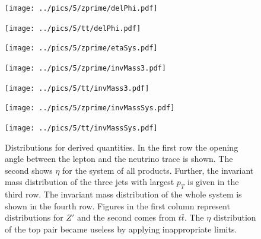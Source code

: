 \begin{figure}[H]
\begin{center}
\begin{minipage}{\minwidth\textwidth}
 \texttt{[image: ../pics/5/zprime/delPhi.pdf]}
\end{minipage}
\begin{minipage}{\minwidth\textwidth}
 \texttt{[image: ../pics/5/tt/delPhi.pdf]}
\end{minipage}

\begin{minipage}{\minwidth\textwidth}
 \texttt{[image: ../pics/5/zprime/etaSys.pdf]}
\end{minipage}
\begin{minipage}{\minwidth\textwidth}
\end{minipage}


\begin{minipage}{\minwidth\textwidth}
 \texttt{[image: ../pics/5/zprime/invMass3.pdf]}
\end{minipage}
\begin{minipage}{\minwidth\textwidth}
 \texttt{[image: ../pics/5/tt/invMass3.pdf]}
\end{minipage}

\begin{minipage}{\minwidth\textwidth}
 \texttt{[image: ../pics/5/zprime/invMassSys.pdf]}
\end{minipage}
\begin{minipage}{\minwidth\textwidth}
 \texttt{[image: ../pics/5/tt/invMassSys.pdf]}
\end{minipage}
\end{center}
\caption{\small{Distributions for derived quantities. In the first row the opening angle between the lepton and the neutrino trace is shown. The second
shows $\eta$ for the system of all products. %
Further, the invariant
mass distribution of the three jets with largest $p_T$ is given in the third row. The invariant mass distribution of the whole system is shown
in the fourth row. Figures in the first column represent distributions for $Z'$ and the second comes from $t\bar t$. The $\eta$ distribution of the 
top pair became useless by applying inappropriate limits.}}
\label{pic:derived}
\end{figure}

